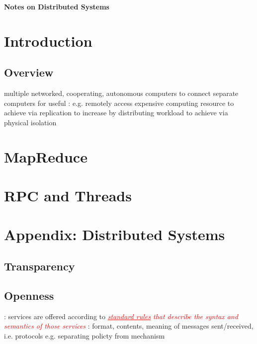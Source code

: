 \documentclass{note}
\begin{document}
\small

\begin{center}
{\large\bf \textcolor{blue2}{Notes on Distributed Systems}}
\end{center}

\vspace*{1cm}

\tableofcontents
\pagebreak

\section{Introduction}
\subsection{Overview}
\bit
\w {} multiple networked, cooperating,
autonomous computers
\w {}
  \bit
  \w to connect separate computers for useful :
  e.g. remotely access expensive computing resource
  \w to achieve  via replication
  \w to increase  by distributing workload
  \w to achieve  via physical isolation
  \eit
\eit

\section{MapReduce}

\section{RPC and Threads}


\section{Appendix: Distributed Systems}
\subsection{Transparency}
  \bit
  \eit
\subsection{Openness}
  \bit
  \w {}: services are offered
  according to \textcolor{red}{\textit{\underline{standard rules} that describe
      the syntax and semantics of those services}}
     \bit
     \w {}: format, contents, meaning of messages
     sent/received, 
     i.e. \textcolor{blue2}{protocols}
     \eit
  \w e.g. 
  \w \textcolor{blue2}{separating policty from mechanism}
  \eit
\end{document}
